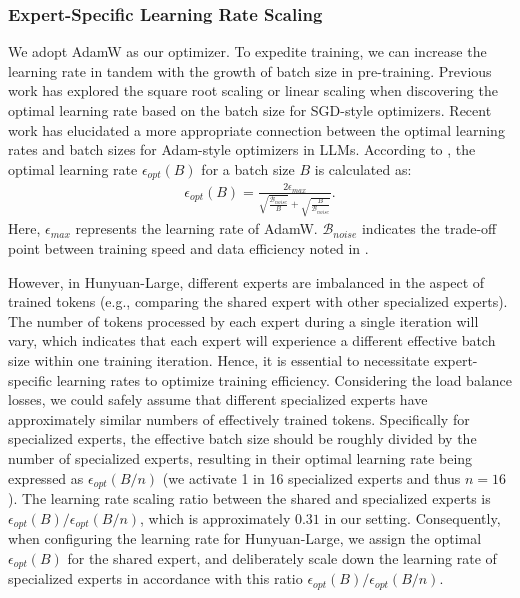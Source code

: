 \documentclass{article}
\begin{document}
\subsubsection{Expert-Specific Learning Rate Scaling}
We adopt AdamW \citep{loshchilov2019decoupled} as our optimizer. To expedite training, we can increase the learning rate in tandem with the growth of batch size in pre-training. 
Previous work has explored the square root scaling \citep{krizhevsky2014one} or linear scaling \citep{goyal2017accurate} when discovering the optimal learning rate based on the batch size for SGD-style optimizers. Recent work has elucidated a more appropriate connection between the optimal learning rates and batch sizes for Adam-style optimizers in LLMs. According to \citet{li2024surge}, the optimal learning rate $\epsilon_{opt}(B)$ for a batch size $B$ is calculated as:
\begin{equation}
\begin{split}
\epsilon_{opt}(B) = \frac{2\epsilon_{max}}{\sqrt{\frac{\mathcal{B}_{noise}}{B}} + \sqrt{\frac{B}{\mathcal{B}_{noise}}}}.
\end{split}
\end{equation}
Here, $\epsilon_{max}$ represents the learning rate of AdamW. $\mathcal{B}_{noise}$ indicates the trade-off point between training speed and data efficiency noted in \citet{kaplan2020scaling}.

However, in Hunyuan-Large, different experts are imbalanced in the aspect of trained tokens (e.g., comparing the shared expert with other specialized experts). The number of tokens processed by each expert during a single iteration will vary, which indicates that each expert will experience a different effective batch size within one training iteration. Hence, it is essential to necessitate expert-specific learning rates to optimize training efficiency. Considering the load balance losses, we could safely assume that different specialized experts have approximately similar numbers of effectively trained tokens.
Specifically for specialized experts, the effective batch size should be roughly divided by the number of specialized experts, resulting in their optimal learning rate being expressed as $\epsilon_{opt}({B}/{n})$ (we activate 1 in 16 specialized experts and thus $n=16$).
The learning rate scaling ratio between the shared and specialized experts is $\epsilon_{opt}(B) / \epsilon_{opt}({B}/{n})$, which is approximately $0.31$ in our setting. Consequently, when configuring the learning rate for Hunyuan-Large, we assign the optimal $\epsilon_{opt}(B)$ for the shared expert, and deliberately scale down the learning rate of specialized experts in accordance with this ratio $\epsilon_{opt}(B) / \epsilon_{opt}({B}/{n})$.
\end{document}
